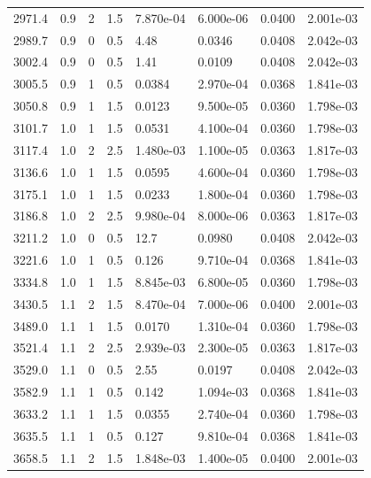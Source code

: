\documentclass[preview]{standalone}
\begin{document}
{{{\begin{tabular}{L{1.2cm}C{1.2cm} C{0.3cm}C{0.5cm} C{1.4cm}C{1.4cm} C{1.4cm}C{1.4cm}}
  2971.4  &   0.9  & 2     & 1.5 &  7.870e-04  & 6.000e-06  & 0.0400 &  2.001e-03   \\ 
  2989.7  &   0.9  & 0     & 0.5 &  4.48  & 0.0346  & 0.0408 &  2.042e-03   \\ 
  3002.4  &   0.9  & 0     & 0.5 &  1.41  & 0.0109  & 0.0408 &  2.042e-03   \\ 
  3005.5  &   0.9  & 1     & 0.5 &  0.0384  & 2.970e-04  & 0.0368 &  1.841e-03   \\ 
  3050.8  &   0.9  & 1     & 1.5 &  0.0123  & 9.500e-05  & 0.0360 &  1.798e-03   \\ 
  3101.7  &   1.0  & 1     & 1.5 &  0.0531  & 4.100e-04  & 0.0360 &  1.798e-03   \\ 
  3117.4  &   1.0  & 2     & 2.5 &  1.480e-03  & 1.100e-05  & 0.0363 &  1.817e-03   \\ 
  3136.6  &   1.0  & 1     & 1.5 &  0.0595  & 4.600e-04  & 0.0360 &  1.798e-03   \\ 
  3175.1  &   1.0  & 1     & 1.5 &  0.0233  & 1.800e-04  & 0.0360 &  1.798e-03   \\ 
  3186.8  &   1.0  & 2     & 2.5 &  9.980e-04  & 8.000e-06  & 0.0363 &  1.817e-03   \\ 
  3211.2  &   1.0  & 0     & 0.5 &  12.7  & 0.0980  & 0.0408 &  2.042e-03   \\ 
  3221.6  &   1.0  & 1     & 0.5 &  0.126  & 9.710e-04  & 0.0368 &  1.841e-03   \\ 
  3334.8  &   1.0  & 1     & 1.5 &  8.845e-03  & 6.800e-05  & 0.0360 &  1.798e-03   \\ 
  3430.5  &   1.1  & 2     & 1.5 &  8.470e-04  & 7.000e-06  & 0.0400 &  2.001e-03   \\ 
  3489.0  &   1.1  & 1     & 1.5 &  0.0170  & 1.310e-04  & 0.0360 &  1.798e-03   \\ 
  3521.4  &   1.1  & 2     & 2.5 &  2.939e-03  & 2.300e-05  & 0.0363 &  1.817e-03   \\ 
  3529.0  &   1.1  & 0     & 0.5 &  2.55  & 0.0197  & 0.0408 &  2.042e-03   \\ 
  3582.9  &   1.1  & 1     & 0.5 &  0.142  & 1.094e-03  & 0.0368 &  1.841e-03   \\ 
  3633.2  &   1.1  & 1     & 1.5 &  0.0355  & 2.740e-04  & 0.0360 &  1.798e-03   \\ 
  3635.5  &   1.1  & 1     & 0.5 &  0.127  & 9.810e-04  & 0.0368 &  1.841e-03   \\ 
  3658.5  &   1.1  & 2     & 1.5 &  1.848e-03  & 1.400e-05  & 0.0400 &  2.001e-03   \\ 

\end{tabular}}}}
\end{document}
